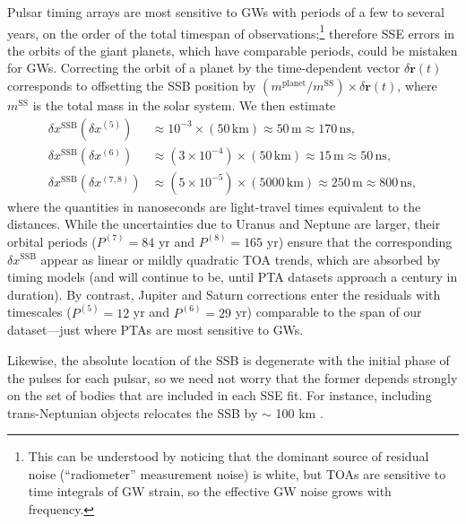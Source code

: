 \documentclass[iop,apj,twocolappendix]{emulateapj}
\begin{document}
Pulsar timing arrays are most sensitive to GWs with periods of a few to several years, on the order of the total timespan of observations;\footnote{This can be understood by noticing that the dominant source of residual noise (``radiometer'' measurement noise) is white, but TOAs are sensitive to time integrals of GW strain, so the effective GW noise grows with frequency.}
therefore SSE errors in the orbits of the giant planets, which have comparable periods, could be mistaken for GWs.
Correcting the orbit of a planet by the time-dependent vector $\delta \mathbf{r}(t)$ corresponds to offsetting the SSB position by $(m^\mathrm{planet}/m^\mathrm{SS}) \times \delta \mathbf{r}(t)$, where $m^\mathrm{SS}$ is the total mass in the solar system. We then estimate
%
\begin{equation}
    \begin{aligned}
    \delta x^\mathrm{SSB}(\delta x^{(5)}) & \approx 10^{-3} \!\times\! (50 \, \mathrm{km}) \approx 50 \, \mathrm{m} \approx 170 \, \mathrm{ns}, \\
    \delta x^\mathrm{SSB}(\delta x^{(6)}) & \approx (3 \!\times\! 10^{-4}) \!\times\! (50 \, \mathrm{km}) \approx 15 \, \mathrm{m} \approx 50 \, \mathrm{ns}, \\
    \delta x^\mathrm{SSB}(\delta x^{(7,8)}) & \approx (5 \!\times\! 10^{-5}) \!\times\! (5000 \, \mathrm{km}) \approx 250 \, \mathrm{m} \approx 800 \, \mathrm{ns},
    \end{aligned}
\end{equation}
%
where the quantities in nanoseconds are light-travel times equivalent to the distances.
While the uncertainties due to Uranus and Neptune are larger, their orbital periods ($P^{(7)} = 84$ yr and $P^{(8)} = 165$ yr) ensure that the corresponding $\delta x^\mathrm{SSB}$ appear as linear or mildly quadratic TOA trends, which are absorbed by timing models (and will continue to be, until PTA datasets approach a century in duration). By contrast, Jupiter and Saturn corrections enter the residuals with timescales ($P^{(5)} = 12$ yr and $P^{(6)} = 29$ yr) comparable to the span of our dataset---just where PTAs are most sensitive to GWs.

Likewise, the absolute location of the SSB is degenerate with the initial phase of the pulses for each pulsar, so we need not worry that the former depends strongly on the set of bodies that are included in each SSE fit. For instance, including trans-Neptunian objects relocates the SSB by $\sim$ 100 km \citep{2014IPNPR.196C...1F}.
\end{document}
